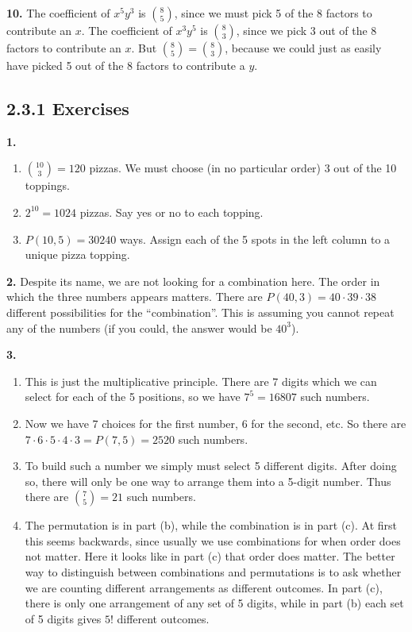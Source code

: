 \documentclass[10pt,]{book}
\theoremstyle{plain}
\theoremstyle{definition}
\theoremstyle{definition}
\theoremstyle{definition}
\numberwithin{equation}{chapter}
\begin{document}
\par\smallskip
\noindent\textbf{10.}\quad{}
            The coefficient of \(x^5y^3\) is \({8\choose 5}\), since we must pick 5 of the 8 factors to contribute an \(x\). The coefficient of \(x^3y^5\) is \({8 \choose 3}\), since we pick 3 out of the 8 factors to contribute an \(x\). But \({8 \choose 5} = {8\choose 3}\), because we could just as easily have picked 5 out of the 8 factors to contribute a \(y\).
\par\smallskip
\subsection*{2.3.1 Exercises}
\noindent\textbf{1.}\quad{}\leavevmode%
\begin{enumerate}[label=(\alph*)]
\item\hypertarget{li-469}{}\({10 \choose 3} = 120\) pizzas.  We must choose (in no particular order) 3 out of the 10 toppings.%
\item\hypertarget{li-470}{}\(2^{10} = 1024\) pizzas.  Say yes or no to each topping.%
\item\hypertarget{li-471}{}\(P(10,5) = 30240\) ways.  Assign each of the 5 spots in the left column to a unique pizza topping.%
\end{enumerate}
\par\smallskip
\noindent\textbf{2.}\quad{}
                Despite its name, we are not looking for a combination here. The order in which the three numbers appears matters. There are \(P(40,3) = 40\cdot 39 \cdot 38\) different possibilities for the ``combination''. This is assuming you cannot repeat any of the numbers (if you could, the answer would be \(40^3\)).
\par\smallskip
\noindent\textbf{3.}\quad{}\leavevmode%
\begin{enumerate}[label=(\alph*)]
\item\hypertarget{li-476}{} This is just the multiplicative principle.  There are 7 digits which we can select for each of the 5 positions, so we have \(7^5 = 16807\) such numbers. %
\item\hypertarget{li-477}{} Now we have 7 choices for the first number, 6 for the second, etc.  So there are \(7 \cdot 6 \cdot 5 \cdot 4 \cdot 3 = P(7,5) = 2520\) such numbers. %
\item\hypertarget{li-478}{} To build such a number we simply must select 5 different digits.  After doing so, there will only be one way to arrange them into a 5-digit number.  Thus there are \({7 \choose 5} = 21\) such numbers. %
\item\hypertarget{li-479}{} The permutation is in part (b), while the combination is in part (c).  At first this seems backwards, since usually we use combinations for when order does not matter.  Here it looks like in part (c) that order does matter.  The better way to distinguish between combinations and permutations is to ask whether we are counting different arrangements as different outcomes.  In part (c), there is only one arrangement of any set of 5 digits, while in part (b) each set of 5 digits gives \(5!\) different outcomes. %
\end{enumerate}
\end{document}
